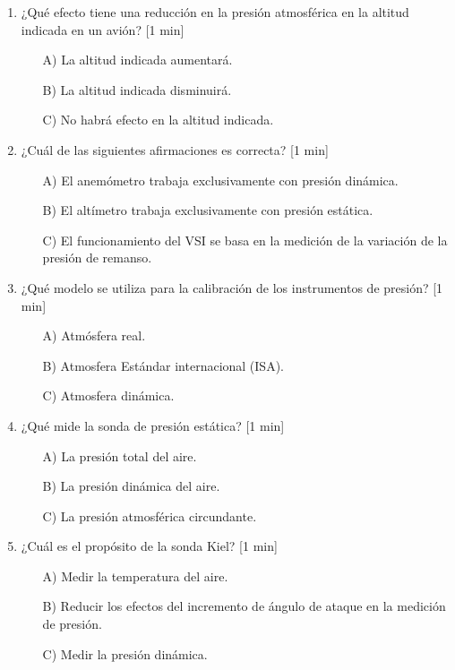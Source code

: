 \begin{enumerate}
\item ¿Qué efecto tiene una reducción en la presión atmosférica en la altitud indicada en un avión? [1 min]
    \begin{itemize}
    \item[A)] La altitud indicada aumentará.
    \item[B)] La altitud indicada disminuirá.
    \item[C)] No habrá efecto en la altitud indicada.\\
    \end{itemize}

\item ¿Cuál de las siguientes afirmaciones es correcta? [1 min]
    \begin{itemize}
    \item[A)] El anemómetro trabaja exclusivamente con presión dinámica.
    \item[B)] El altímetro trabaja exclusivamente con presión estática.
    \item[C) ]El funcionamiento del VSI se basa en la medición de la variación de la presión de remanso.\\
    \end{itemize}  
    
 \item ¿Qué modelo se utiliza para la calibración de los instrumentos de presión? [1 min]
\begin{itemize}
    \item[A)] Atmósfera real.
    \item[B)] Atmosfera Estándar internacional (ISA).
    \item[C)] Atmosfera dinámica.\\
\end{itemize}

\item ¿Qué mide la sonda de presión estática? [1 min]
\begin{itemize}
    \item[A)] La presión total del aire.
    \item[B)] La presión dinámica del aire.
    \item[C)] La presión atmosférica circundante.\\
\end{itemize}

\item ¿Cuál es el propósito de la sonda Kiel? [1 min] 
    \begin{itemize}
    \item[A)] Medir la temperatura del aire. 
    \item[B)] Reducir los efectos del incremento de ángulo de ataque en la medición de presión. 
    \item[C)] Medir la presión dinámica. \\
    \end{itemize}


\end{enumerate}
